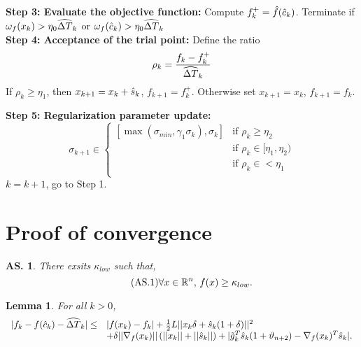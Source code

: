 \documentclass{article}[12pt]
\newtheorem{lemma}[]{Lemma}
\newtheorem{assumption}[]{\textbf{AS.}}
\begin{document}
\begin{algorithm}
\begin{algorithmic}
			
			
			
			\State \textbf{Step 3: Evaluate the objective function: }
			Compute $f_k^+ = \hat{f}(\hat{c}_k)$.
			Terminate if $\omega_f(x_k)> \eta_0 \widehat{\Delta T}_k$ or $\omega_f(\hat{c}_k)> \eta_0 \widehat{\Delta T}_k$\\
			
			\State \textbf{Step 4: Acceptance of the trial point: } Define the ratio
			\begin{equation}
				\rho_k = \dfrac{f_k - f_k^+}{\widehat{\Delta T}_k}
			\end{equation}
			If $\rho_k \geq \eta_1$, then $x_{k+1} = x_k+\hat{s}_{k}$, $f_{k+1} = f_k^+$.	Otherwise set $x_{k+1} = x_k$, $f_{k+1} = f_k$.
			
			\State \textbf{Step 5: Regularization  parameter update: }
			\begin{equation}
				\label{eq:sigma_update}
				\sigma_{k+1} \in \left\{
				\begin{array}{ll}
					[\max(\sigma_{min},\gamma_1\sigma_k),\sigma_k] & \text{if } \rho_k \geq \eta_2\\
					
					[\sigma_k,\gamma_2\sigma_k] & \text{if }\rho_k \in [\eta_1,\eta_2) \\
					
					[\gamma_2\sigma_k,\gamma_3\sigma_k] & \text{if } \rho_k \in < \eta_1 \\
				\end{array}
				\right.
			\end{equation}
			$k = k+1$, go to Step 1.
	
		\end{algorithmic}
	\end{algorithm}


	\newpage
    \section{Proof of convergence}
    \label{sec:proof}
    
    \begin{assumption}
    There exsits $\kappa_{low}$ such that,
    \begin{equation}
    	\tag{AS.1}
    	\label{as:flb}
    	\forall x \in \mathbb{R}^n,\, f(x) \geq \kappa_{low}.
    \end{equation} 
    \end{assumption}
    
    \begin{lemma}
    	\label{lem:f_pseudotaylor_diff_sum_inexact}
    	For all $k>0$,
    	\begin{equation}
    		\begin{array}{ll}
    			|f_k - f(\hat{c}_k) -\widehat{\Delta T}_k| \leq & |f(x_k)-f_k| + \tfrac{1}{2}L||x_k \delta+\hat{s}_{k}(1+\delta)||^2\\
    			&  + \delta||\nabla_f(x_k)||\left(||x_k||+||\hat{s}_{k}||\right)+  |\tilde{g}_k^T\hat{s}_{k}(1+\vartheta_{n+2}) - \nabla_f(x_k)^T\hat{s}_{k}|.
    		\end{array}
    	\end{equation}
    \end{lemma}
    
\end{document}
